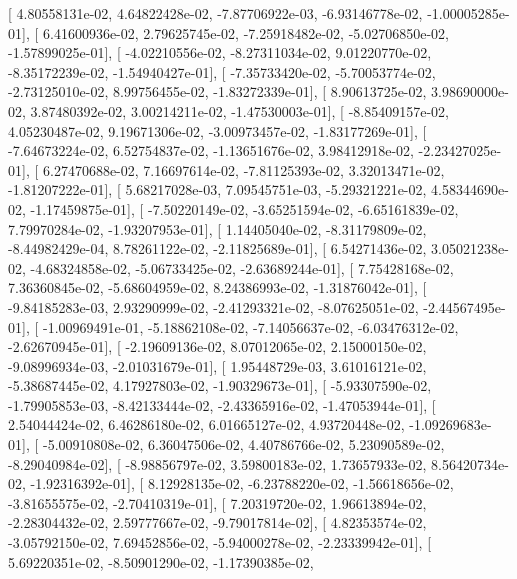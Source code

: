 \documentclass{article}
\begin{document}
       [  4.80558131e-02,   4.64822428e-02,  -7.87706922e-03,
         -6.93146778e-02,  -1.00005285e-01],
       [  6.41600936e-02,   2.79625745e-02,  -7.25918482e-02,
         -5.02706850e-02,  -1.57899025e-01],
       [ -4.02210556e-02,  -8.27311034e-02,   9.01220770e-02,
         -8.35172239e-02,  -1.54940427e-01],
       [ -7.35733420e-02,  -5.70053774e-02,  -2.73125010e-02,
          8.99756455e-02,  -1.83272339e-01],
       [  8.90613725e-02,   3.98690000e-02,   3.87480392e-02,
          3.00214211e-02,  -1.47530003e-01],
       [ -8.85409157e-02,   4.05230487e-02,   9.19671306e-02,
         -3.00973457e-02,  -1.83177269e-01],
       [ -7.64673224e-02,   6.52754837e-02,  -1.13651676e-02,
          3.98412918e-02,  -2.23427025e-01],
       [  6.27470688e-02,   7.16697614e-02,  -7.81125393e-02,
          3.32013471e-02,  -1.81207222e-01],
       [  5.68217028e-03,   7.09545751e-03,  -5.29321221e-02,
          4.58344690e-02,  -1.17459875e-01],
       [ -7.50220149e-02,  -3.65251594e-02,  -6.65161839e-02,
          7.79970284e-02,  -1.93207953e-01],
       [  1.14405040e-02,  -8.31179809e-02,  -8.44982429e-04,
          8.78261122e-02,  -2.11825689e-01],
       [  6.54271436e-02,   3.05021238e-02,  -4.68324858e-02,
         -5.06733425e-02,  -2.63689244e-01],
       [  7.75428168e-02,   7.36360845e-02,  -5.68604959e-02,
          8.24386993e-02,  -1.31876042e-01],
       [ -9.84185283e-03,   2.93290999e-02,  -2.41293321e-02,
         -8.07625051e-02,  -2.44567495e-01],
       [ -1.00969491e-01,  -5.18862108e-02,  -7.14056637e-02,
         -6.03476312e-02,  -2.62670945e-01],
       [ -2.19609136e-02,   8.07012065e-02,   2.15000150e-02,
         -9.08996934e-03,  -2.01031679e-01],
       [  1.95448729e-03,   3.61016121e-02,  -5.38687445e-02,
          4.17927803e-02,  -1.90329673e-01],
       [ -5.93307590e-02,  -1.79905853e-03,  -8.42133444e-02,
         -2.43365916e-02,  -1.47053944e-01],
       [  2.54044424e-02,   6.46286180e-02,   6.01665127e-02,
          4.93720448e-02,  -1.09269683e-01],
       [ -5.00910808e-02,   6.36047506e-02,   4.40786766e-02,
          5.23090589e-02,  -8.29040984e-02],
       [ -8.98856797e-02,   3.59800183e-02,   1.73657933e-02,
          8.56420734e-02,  -1.92316392e-01],
       [  8.12928135e-02,  -6.23788220e-02,  -1.56618656e-02,
         -3.81655575e-02,  -2.70410319e-01],
       [  7.20319720e-02,   1.96613894e-02,  -2.28304432e-02,
          2.59777667e-02,  -9.79017814e-02],
       [  4.82353574e-02,  -3.05792150e-02,   7.69452856e-02,
         -5.94000278e-02,  -2.23339942e-01],
       [  5.69220351e-02,  -8.50901290e-02,  -1.17390385e-02,
\end{document}
